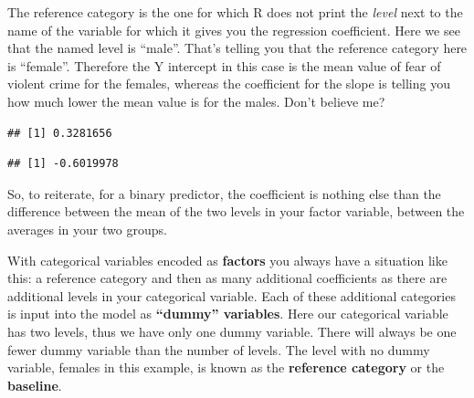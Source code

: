 \documentclass[]{book}
\newenvironment{Shaded}{\begin{snugshade}}{\end{snugshade}}
\newcommand{\DataTypeTok}[1]{\textcolor[rgb]{0.13,0.29,0.53}{#1}}
\newcommand{\KeywordTok}[1]{\textcolor[rgb]{0.13,0.29,0.53}{\textbf{#1}}}
\newcommand{\NormalTok}[1]{#1}
\newcommand{\OperatorTok}[1]{\textcolor[rgb]{0.81,0.36,0.00}{\textbf{#1}}}
\newcommand{\OtherTok}[1]{\textcolor[rgb]{0.56,0.35,0.01}{#1}}
\newcommand{\StringTok}[1]{\textcolor[rgb]{0.31,0.60,0.02}{#1}}
\theoremstyle{definition}
\theoremstyle{definition}
\theoremstyle{definition}
\theoremstyle{remark}
\begin{document}
The reference category is the one for which R does not print the
\emph{level} next to the name of the variable for which it gives you the
regression coefficient. Here we see that the named level is ``male''.
That's telling you that the reference category here is ``female''.
Therefore the Y intercept in this case is the mean value of fear of
violent crime for the females, whereas the coefficient for the slope is
telling you how much lower the mean value is for the males. Don't
believe me?

\begin{Shaded}
\end{Shaded}

\begin{verbatim}
## [1] 0.3281656
\end{verbatim}

\begin{Shaded}
\end{Shaded}

\begin{verbatim}
## [1] -0.6019978
\end{verbatim}

So, to reiterate, for a binary predictor, the coefficient is nothing
else than the difference between the mean of the two levels in your
factor variable, between the averages in your two groups.

With categorical variables encoded as \textbf{factors} you always have a
situation like this: a reference category and then as many additional
coefficients as there are additional levels in your categorical
variable. Each of these additional categories is input into the model as
\textbf{``dummy'' variables}. Here our categorical variable has two
levels, thus we have only one dummy variable. There will always be one
fewer dummy variable than the number of levels. The level with no dummy
variable, females in this example, is known as the \textbf{reference
category} or the \textbf{baseline}.
\end{document}
